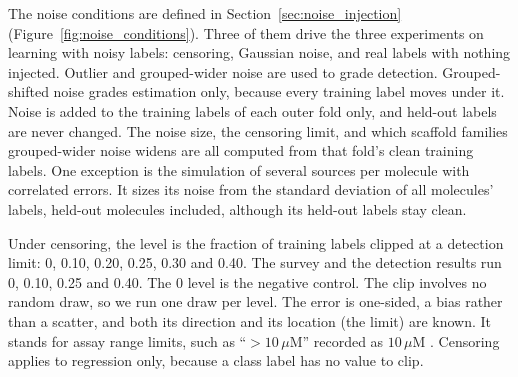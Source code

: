 
The noise conditions are defined in Section~\ref{sec:noise_injection} (Figure~\ref{fig:noise_conditions}). Three of them drive the three experiments on learning with noisy labels: censoring, Gaussian noise, and real labels with nothing injected. Outlier and grouped-wider noise are used to grade detection. Grouped-shifted noise grades estimation only, because every training label moves under it. Noise is added to the training labels of each outer fold only, and held-out labels are never changed. The noise size, the censoring limit, and which scaffold families grouped-wider noise widens are all computed from that fold's clean training labels.
One exception is the simulation of several sources per molecule with correlated errors. It sizes its noise from the standard deviation of all molecules' labels, held-out molecules included, although its held-out labels stay clean.

Under censoring, the level is the fraction of training labels clipped at a detection limit: 0, 0.10, 0.20, 0.25, 0.30 and 0.40. The survey and the detection results run 0, 0.10, 0.25 and 0.40. The 0 level is the negative control. The clip involves no random draw, so we run one draw per level. The error is one-sided, a bias rather than a scatter, and both its direction and its location (the limit) are known. It stands for assay range limits, such as ``$>10\,\mu$M'' recorded as $10\,\mu$M \citep{Svensson2025}. Censoring applies to regression only, because a class label has no value to clip.

